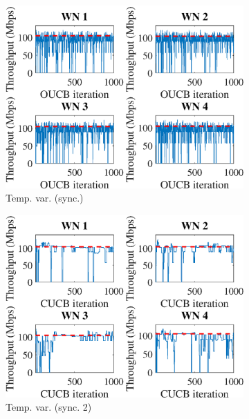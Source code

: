 \documentclass[preprint,12pt]{article}
\begin{document}
\begin{figure}[h!]
\begin{subfigure}[b]{.3\textwidth}
		\includegraphics[width=\textwidth]{images/temporal_individual_tpt_OUCB}
		\caption{Temp. var.  (sync.)}\label{fig:temporal_individual_tpt_OUCB}
	\end{subfigure}
		\begin{subfigure}[b]{.3\textwidth}
		\includegraphics[width=\textwidth]{images/temporal_individual_tpt_CUCB}
		\caption{Temp. var.  (sync. 2)}\label{fig:temporal_individual_tpt_CUCB}
	\end{subfigure}\\
	\begin{subfigure}[b]{.3\textwidth}

\end{subfigure}
\end{figure}
\end{document}
